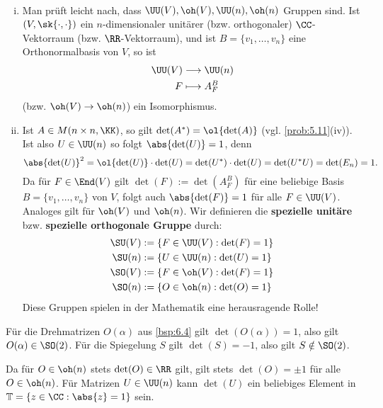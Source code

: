 \begin{bemerkung}
	\mbox{} \\[-1.4cm]
	\begin{enumerate}[(i)]
		\item Man prüft leicht nach, dass $\UU(V), \oh(V), \UU(n), \oh(n)$ Gruppen sind.
		Ist $(V,\sk{\cdot,\cdot})$ ein $n$-dimensionaler unitärer (bzw. orthogonaler) $\CC$-Vektorraum (bzw. $\RR$-Vektorraum), und ist $B = \{v_1,\dots,v_n\}$ eine Orthonormalbasis von $V$, so ist
		\begin{align*}
			\UU(V) &\longrightarrow \UU(n) \\
			F &\longmapsto A_F^B
		\end{align*}
		(bzw. $\oh(V) \rightarrow \oh(n)$) ein Isomorphismus.
		\item Ist $A \in M(n \times n,\KK)$, so gilt $\det(A^*) = \ol{\det(A)}$ (vgl. \autoref{prob:5.11}(iv)).
		Ist also $U \in \UU(n)$ so folgt $\abs{\det(U)} = 1$, denn
		\[
			\abs{\det(U)}^2 = \ol{\det(U)} \cdot \det(U) = \det(U^*) \cdot \det(U) = \det(U^*U) = \det(E_n) = 1.
		\]
		Da für $F \in \End(V)$ gilt $\det(F) := \det(A_F^B)$ für eine beliebige Basis $B = \{v_1,\dots,v_n\}$ von $V$, folgt auch $\abs{\det(F)}=1$ für alle $F \in \UU(V)$.
		Analoges gilt für $\oh(V)$ und $\oh(n)$.
		\newpage
		Wir definieren die \textbf{spezielle unitäre} bzw. \textbf{spezielle orthogonale Gruppe} durch:  
		\begin{align*}
			\SU(V) &:= \{F \in \UU(V) : \det(F) = 1\} \\
			\SU(n) &:= \{U \in \UU(n) : \det(U) = 1\} \\
			\SO(V) &:= \{F \in \oh(V) : \det(F) = 1\} \\
			\SO(n) &:= \{O \in \oh(n) : \det(O) = 1\} 
		\end{align*}
		Diese Gruppen spielen in der Mathematik eine herausragende Rolle!
	\end{enumerate}
\end{bemerkung}

\begin{beispiel}
	\label{bsp:6.7}
	Für die Drehmatrizen $O(\alpha)$ aus \autoref{bsp:6.4} gilt $\det(O(\alpha)) = 1$, also gilt $O(\alpha) \in \SO(2)$.
	Für die Spiegelung $S$ gilt $\det(S) = -1$, also gilt $S \notin \SO(2)$.
	
	Da für $O \in \oh(n)$ stets $\det(O) \in \RR$ gilt, gilt stets $\det(O) = \pm 1$ für alle $O \in \oh(n)$.
	Für Matrizen $U \in \UU(n)$ kann $\det(U)$ ein beliebiges Element in $\mathbb{T} = \{z \in \CC: \abs{z}=1\}$ sein.
\end{beispiel}

